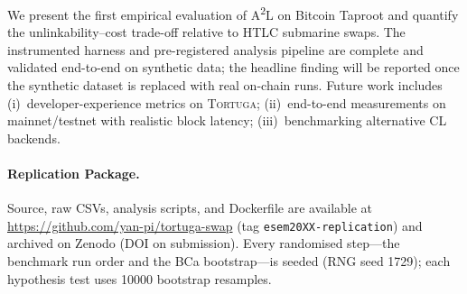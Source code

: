 \documentclass[sigconf,nonacm]{acmart}
\newcommand{\toolname}{\textsc{Tortuga}\xspace}
\newcommand{\atwol}{A\textsuperscript{2}L\xspace}
\newcommand{\code}[1]{\texttt{\small #1}}
\begin{document}
We present the first empirical evaluation of \atwol on Bitcoin Taproot and
quantify the unlinkability--cost trade-off relative to HTLC submarine swaps.
The instrumented harness and pre-registered analysis pipeline are complete
and validated end-to-end on synthetic data; the headline finding will be
reported once the synthetic dataset is replaced with real on-chain runs.
Future work includes (i)~developer-experience metrics on \toolname;
(ii)~end-to-end measurements on mainnet/testnet with realistic block latency;
(iii)~benchmarking alternative CL backends.

\paragraph*{Replication Package.}
Source, raw CSVs, analysis scripts, and Dockerfile are available at
\url{https://github.com/yan-pi/tortuga-swap} (tag \code{esem20XX-replication})
and archived on Zenodo (DOI on submission). Every randomised step---the
benchmark run order and the BCa bootstrap---is seeded (RNG seed
\num{1729}); each hypothesis test uses \num{10000} bootstrap resamples.



\end{document}
